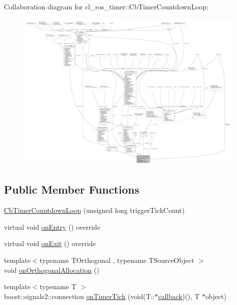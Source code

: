 Collaboration diagram for cl\+\_\+ros\+\_\+timer\+:\+:Cb\+Timer\+Countdown\+Loop\+:
\nopagebreak
\begin{figure}[H]
\begin{center}
\leavevmode
\includegraphics[width=350pt]{classcl__ros__timer_1_1CbTimerCountdownLoop__coll__graph}
\end{center}
\end{figure}
\subsection*{Public Member Functions}
\begin{DoxyCompactItemize}
\item 
\hyperlink{classcl__ros__timer_1_1CbTimerCountdownLoop_a8cdfe250d9469ea019b61051be123195}{Cb\+Timer\+Countdown\+Loop} (unsigned long trigger\+Tick\+Count)
\item 
virtual void \hyperlink{classcl__ros__timer_1_1CbTimerCountdownLoop_aa088f15db4fb2c307c86b30b2e1f7744}{on\+Entry} () override
\item 
virtual void \hyperlink{classcl__ros__timer_1_1CbTimerCountdownLoop_a5623e9fdd8f0fb23e8707f7816c099d6}{on\+Exit} () override
\item 
{\footnotesize template$<$typename T\+Orthogonal , typename T\+Source\+Object $>$ }\\void \hyperlink{classcl__ros__timer_1_1CbTimerCountdownLoop_a17ca92a8d78d823b217b0418fa3b09d7}{on\+Orthogonal\+Allocation} ()
\item 
{\footnotesize template$<$typename T $>$ }\\boost\+::signals2\+::connection \hyperlink{classcl__ros__timer_1_1CbTimerCountdownLoop_ad251cc8444ca7070f64658bbb77e1275}{on\+Timer\+Tick} (void(T\+::$\ast$\hyperlink{sm__ridgeback__barrel__search__2_2servers_2opencv__perception__node_2opencv__perception__node_8cpp_a050e697bd654facce10ea3f6549669b3}{callback})(), T $\ast$object)
\end{DoxyCompactItemize}
